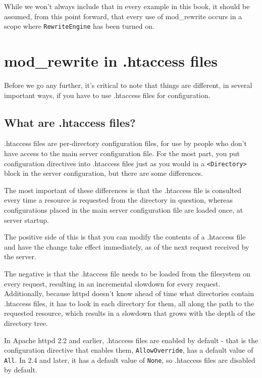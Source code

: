 While we won't always include that in every example in this book, it should be assumed, from this point forward, that every use of mod\_rewrite occurs in a scope where \verb~RewriteEngine~ has been turned on.

\section{mod\_rewrite in .htaccess files}

Before we go any further, it's critical to note that things are different, in several important ways, if you have to use .htaccess files for configuration.

\subsection{What are .htaccess files?}

.htaccess files are per-directory configuration files, for use by people who don't have access to the main server configuration file. For the most part, you put configuration directives into .htaccess files just as you would in a \verb~<Directory>~ block in the server configuration, but there are some differences.

The most important of these differences is that the .htaccess file is consulted every time a resource is requested from the directory in question, whereas configurations placed in the main server configuration file are loaded once, at server startup. 

The positive side of this is that you can modify the contents of a .htaccess file and have the change take effect immediately, as of the next request received by the server.

The negative is that the .htaccess file needs to be loaded from the filesystem on every request, resulting in an incremental slowdown for every request. Additionally, because httpd doesn't know ahead of time what directories contain .htaccess files, it has to look in each directory for them, all along the path to the requested resource, which results in a slowdown that grows with the depth of the directory tree.

In Apache httpd 2.2 and earlier, .htaccess files are enabled by default - that is the configuration directive that enables them, \verb~AllowOverride~, has a default value of \verb~All~. In 2.4 and later, it has a default value of \verb~None~, so .htaccess files are disabled by default.

